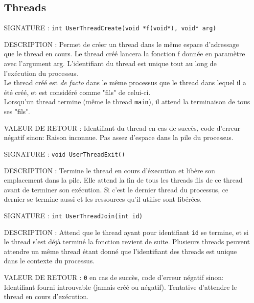 \documentclass{article}
\begin{document}
	\subsection{Threads}
		\begin{description}
			\item{SIGNATURE : } \texttt{int UserThreadCreate(void *f(void*), void* arg)}
			\item{DESCRIPTION : } Permet de créer un thread dans le même espace d'adressage que le thread en cours. Le thread créé lancera la fonction f donnée en paramètre avec l'argument arg. L'identifiant du thread est unique tout au long de l'exécution du processus. \\
			Le thread créé est \emph{de facto} dans le même processus que le thread dans lequel il a été créé, et est considéré comme "fils" de celui-ci. \\
			Lorsqu'un thread termine (même le thread \texttt{main}), il attend la terminaison de tous ses "fils".
			\item{VALEUR DE RETOUR : } Identifiant du thread en cas de succès, code d'erreur négatif sinon:
				 Raison inconnue.
				 Pas assez d'espace dans la pile du processus.
		\end{description}
		\vspace{2.5mm}
		\begin{description}
			\item{SIGNATURE : } \texttt{void UserThreadExit()}
			\item{DESCRIPTION : } Termine le thread en cours d'éxecution et libère son emplacement dans la pile. Elle attend la fin de tous les threads fils de ce thread avant de terminer son exécution. Si c'est le dernier thread du processus, ce dernier se termine aussi et les ressources qu'il utilise sont libérées.
		\end{description}
		\vspace{2.5mm}
		\begin{description}
			\item{SIGNATURE : } \texttt{int UserThreadJoin(int id)}
			\item{DESCRIPTION : } Attend que le thread ayant pour identifiant \texttt{id} se termine, et si le thread s'est déjà terminé la fonction revient de suite. Plusieurs threads peuvent attendre un même thread étant donné que l'identifiant des threads est unique dans le contexte du processus.
			\item{VALEUR DE RETOUR : } \texttt{0} en cas de succès, code d'erreur négatif sinon:
				 Identifiant fourni introuvable (jamais créé ou négatif).
				 Tentative d'attendre le thread en cours d'exécution.
		\end{description}
\end{document}
